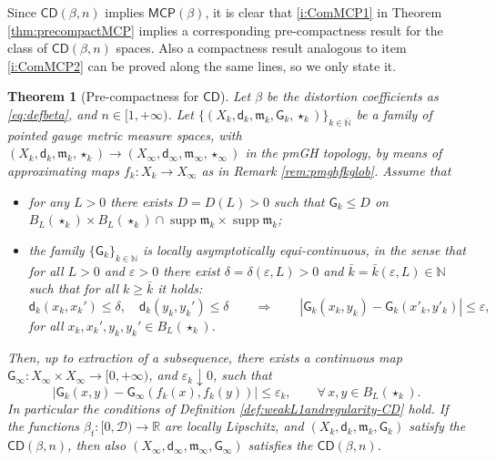 \documentclass[11pt,a4paper]{article}
\theoremstyle{plain}
\newtheorem{theorem}{Theorem}[section]
\theoremstyle{definition}
\theoremstyle{remark}
\numberwithin{equation}{section}
\newcommand{\R}{\mathbb{R}} %
\newcommand{\N}{\mathbb{N}} %
\DeclareMathOperator{\supp}{\mathrm{supp}}
\newcommand{\ve}{\varepsilon}
\newcommand{\CD}{\mathsf{CD}}
\newcommand{\MCP}{\mathsf{MCP}}
\newcommand{\cD}{\mathcal{D}}
\newcommand{\mm}{\mathfrak m}
\newcommand{\sfd}{\mathsf d}
\newcommand{\sfG}{\mathsf G}
\begin{document}
Since $\CD(\beta,n)$ implies $\MCP(\beta)$, it is clear that \ref{i:ComMCP1} in Theorem \ref{thm:precompactMCP}  implies a corresponding pre-compactness result for the class of $\CD(\beta,n)$ spaces. Also a compactness result analogous to item \ref{i:ComMCP2} can be proved along the same lines, so  we only state it.


\begin{theorem}[Pre-compactness for $\CD$]\label{thm:precompact-CD}
Let $\beta$ be the distortion coefficients as \eqref{eq:defbeta}, and $n\in [1,+\infty)$. Let $\{(X_k,\sfd_k,\mm_k, \sfG_k,\star_k)\}_{k\in \bar{\N}}$ be a family of pointed gauge metric measure spaces, with $(X_k,\sfd_k,\mm_k,\star_k)\to (X_\infty,\sfd_\infty,\mm_\infty,\star_\infty)$ in the pmGH topology, by means of approximating maps $f_k:X_k \to X_\infty$  as in  Remark \ref{rem:pmghfkglob}. Assume that
\begin{itemize}
\item  for any $L>0$ there exists $D=D(L)>0$ such that $\sfG_k\leq D$ on $B_L(\star_k)\times B_L(\star_k) \cap \supp\mm_k\times \supp\mm_k$;
\item the family $\{\sfG_k\}_{k\in\N}$ is locally asymptotically equi-continuous, in the sense that for all $L>0$ and $\ve>0$ there exist $\delta=\delta(\ve,L)>0$ and $\bar{k}=\bar{k}(\ve,L)\in \N$ such that for all $k\geq \bar{k}$ it holds:
\begin{equation}
\sfd_k(x_k,x_k')\leq \delta, \quad \sfd_k(y_k,y_k')\leq \delta \qquad \Longrightarrow \qquad |\sfG_k(x_k,y_k)-\sfG_k(x'_k,y'_k)| \leq \ve,
\end{equation}
for all $x_k,x_k',y_k,y_k'\in B_L(\star_k)$.
\end{itemize}
 Then, up to extraction of a subsequence, there exists a continuous map $\sfG_\infty:X_\infty\times X_\infty \to [0,+\infty)$, and $\varepsilon_k \downarrow 0$, such that
\begin{equation}
|\sfG_k(x,y) - \sfG_\infty(f_k(x),f_k(y))|\leq \varepsilon_k, \qquad \forall\, x,y\in B_{L}(\star_k).
\end{equation}
In particular the conditions of Definition \ref{def:weakL1andregularity-CD} hold. If the functions $\beta_t:[0,\cD)\to \R$ are locally Lipschitz, and $(X_k,\sfd_k,\mm_k, \sfG_k)$ satisfy the $\CD(\beta,n)$, then also $(X_\infty,\sfd_\infty,\mm_\infty, \sfG_\infty)$ satisfies the $\CD(\beta,n)$.
\end{theorem}
\end{document}
